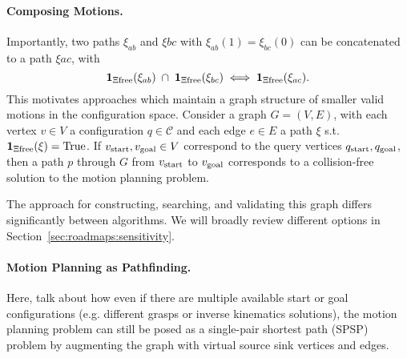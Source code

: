 \paragraph{Composing Motions.}
Importantly,
two paths $\xi_{ab}$ and $\xi{bc}$ with $\xi_{ab}(1) = \xi_{bc}(0)$
can be concatenated to a path $\xi{ac}$,
with
\begin{equation}
   \mathbf{1}_{\Xi\mbox{\scriptsize free}}(\xi_{ab})
   \;\cap\;
   \mathbf{1}_{\Xi\mbox{\scriptsize free}}(\xi_{bc})
   \iff
   \mathbf{1}_{\Xi\mbox{\scriptsize free}}(\xi_{ac}).
\end{equation}
This motivates approaches which maintain a graph structure of
smaller valid motions in the configuration space.
Consider a graph $G = (V,E)$,
with each vertex $v \in V$ a configuration $q \in \mathcal{C}$
and each edge $e \in E$ a path $\xi$
s.t.  $\mathbf{1}_{\Xi\mbox{\scriptsize free}}(\xi) = \mbox{True}$.
If $v_{\mbox{\scriptsize start}}, v_{\mbox{\scriptsize goal}} \in V$
correspond to the query vertices $q_{\mbox{\scriptsize start}}, q_{\mbox{\scriptsize goal}}$,
then a path $p$ through $G$ from
$v_{\mbox{\scriptsize start}}$ to $v_{\mbox{\scriptsize goal}}$
corresponds to a collision-free solution to the motion planning problem.

The approach for constructing, searching, and validating this graph
differs significantly between algorithms.
We will broadly review different options in
Section~\ref{sec:roadmaps:sensitivity}.



\paragraph{Motion Planning as Pathfinding.}
\label{subsec:roadmaps:planning-as-pathfinding}
Here, talk about how even if there are multiple available
start or goal configurations
(e.g. different grasps or inverse kinematics solutions),
the motion planning problem can still be posed as a
single-pair shortest path (SPSP) problem
by augmenting the graph with virtual source sink vertices
and edges.

